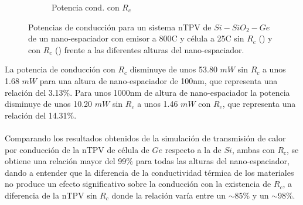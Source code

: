 \begin{figure}[H]
\begin{subfigure}[b]{0.49\textwidth}
		\caption{Potencia cond. con $R_c$}
		\label{fig:Prc_SiSiO2Ge}
	\end{subfigure}
	\caption{Potencias de conducción para un sistema nTPV de $Si-SiO_2-Ge$ de un nano-espaciador con emisor a 800\textdegree C y célula a 25\textdegree C sin $R_c$ () y con $R_c$ () frente a las diferentes alturas del nano-espaciador.}
	\label{fig:Pcond_SiSiO2Ge}
\end{figure}
La potencia de conducción con $R_c$ disminuye de unos 53.80 $mW$ sin $R_c$ a unos 1.68 $mW$ para una altura de nano-espaciador de 100nm, que representa una relación del 3.13\%. Para unos 1000nm de altura de nano-espaciador la potencia disminuye de unos 10.20 $mW$ sin $R_c$ a unos 1.46 $mW$ con $R_c$, que representa una relación del 14.31\%.\\\\
Comparando los resultados obtenidos de la simulación de transmisión de calor por conducción de la nTPV de célula de $Ge$ respecto a la de $Si$, ambas con $R_c$, se obtiene una relación mayor del 99\% para todas las alturas del nano-espaciador, dando a entender que la diferencia de la conductividad térmica de los materiales no produce un efecto significativo sobre la conducción con la existencia de $R_c$, a diferencia de la nTPV sin $R_c$ donde la relación varía entre un $\sim$85\% y un $\sim$98\%.
\vfill
